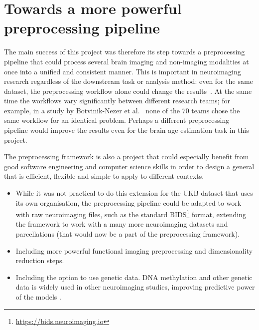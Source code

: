 
\section{Towards a more powerful preprocessing pipeline}
The main success of this project was therefore its step towards a preprocessing pipeline that could process several brain imaging and non-imaging modalities at once into a unified and consistent manner. This is important in neuroimaging research regardless of the downstream task or analysis method: even for the same dataset, the preprocessing workflow alone could change the results~\cite{salehi2020there}. At the same time the workflows vary significantly between different research teams; for example, in a study by Botvinik-Nezer et al.~\cite{botvinik2019variability} none of the 70 teams chose the same workflow for an identical problem. Perhaps a different preprocessing pipeline would improve the results even for the brain age estimation task in this project.

The preprocessing framework is also a project that could especially benefit from good software engineering and computer science skills in order to design a general that is efficient, flexible and simple to apply to different contexts.
\begin{itemize}
    \item While it was not practical to do this extension for the UKB dataset that uses its own organisation, the preprocessing pipeline could be adapted to work with raw neuroimaging files, such as the standard BIDS\footnote{\url{https://bids.neuroimaging.io}} format, extending the framework to work with a many more neuroimaging datasets and parcellations (that would now be a part of the preprocessing framework).
    \item Including more powerful functional imaging preprocessing and dimensionality reduction steps.
    \item Including the option to use genetic data. DNA methylation and other genetic data is widely used in other neuroimaging studies, improving predictive power of the models \cite{cole2018brain,parisot2018disease}.
\end{itemize}

